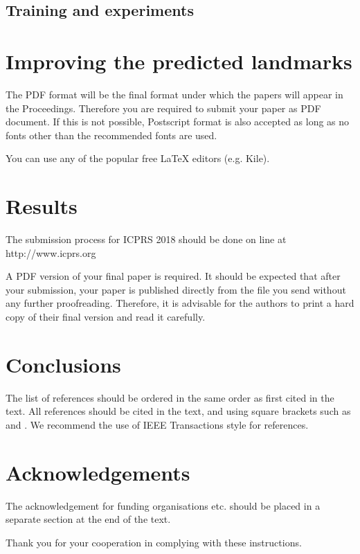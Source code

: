 \documentclass[10pt]{article}
\begin{document}
\subsection{Training and experiments}

\section{Improving the predicted landmarks}
The PDF format will be the final format under which the
papers will appear in the Proceedings. Therefore you are
required to submit your paper as PDF document. If this is not
possible, Postscript format is also accepted as long as no fonts
other than the recommended fonts are used.

You can use any of the popular free LaTeX editors (e.g. Kile).

\section{Results}
The submission process for ICPRS 2018 should be done on
line at http://www.icprs.org

A PDF version of your final paper is required. It should
be expected that after your submission, your paper is
published directly from the file you send without any further
proofreading. Therefore, it is advisable for the authors to
print a hard copy of their final version and read it carefully.

\section{Conclusions}
The list of references should be ordered in the same order as
first cited in the text. All references should be cited in the
text, and using square brackets such as \cite{ref01} and \cite{ref01,ref02}. We
recommend the use of IEEE Transactions style for references.

\section*{Acknowledgements}
The acknowledgement for funding organisations etc. should
be placed in a separate section at the end of the text.



Thank you for your cooperation in complying with these
instructions.



\end{document}

